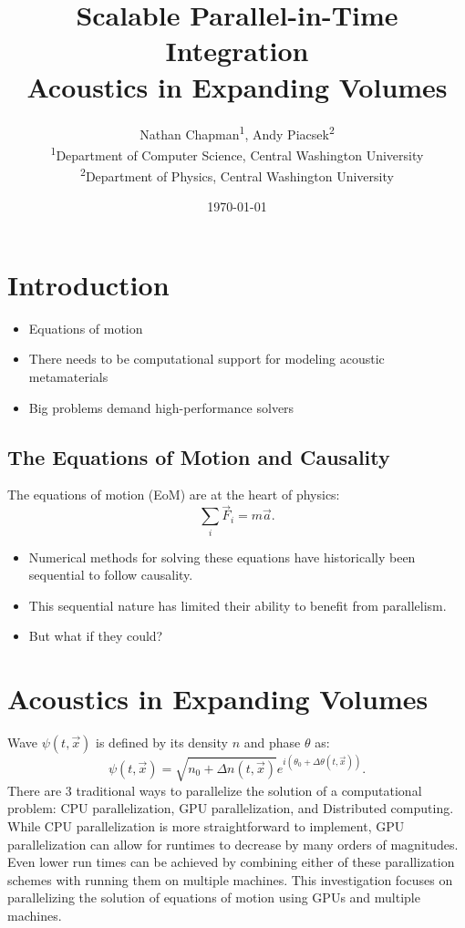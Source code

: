 \title{Scalable Parallel-in-Time Integration \\ \Large{Acoustics in Expanding Volumes}}
\author{
    Nathan Chapman\textsuperscript{1}, Andy Piacsek\textsuperscript{2} \\
    \textsuperscript{1}Department of Computer Science, Central Washington University \\
    \textsuperscript{2}Department of Physics, Central Washington University
}
\date{\today}

\maketitle

\section*{Introduction}
	\begin{itemize}
		\item Equations of motion
		\item There needs to be computational support for modeling acoustic metamaterials
		\item Big problems demand high-performance solvers
	\end{itemize}

\subsection*{The Equations of Motion and Causality}
The equations of motion (EoM) are at the heart of physics:
\[
\sum_i \vec{F}_i = m\vec{a}.
\]

\begin{itemize}
	\item Numerical methods for solving these equations have historically been sequential to follow causality. 
	\item This sequential nature has limited their ability to benefit from parallelism. 
	\item But what if they could?
\end{itemize}

\section*{Acoustics in Expanding Volumes}
Wave $\psi(t, \vec{x})$ is defined by its density $n$ and phase $\theta$ as:
\[
\psi(t, \vec{x}) = \sqrt{n_0 + \Delta n(t, \vec{x})} e^{i(\theta_0 + \Delta \theta(t, \vec{x}))}.
\]
	There are 3 traditional ways to parallelize the solution of a computational problem: 
	CPU parallelization, 
	GPU parallelization, 
	and Distributed computing.  
	While CPU parallelization is more straightforward to implement, GPU parallelization can allow for runtimes to decrease by many orders of magnitudes.
	Even lower run times can be achieved by combining either of these parallization schemes with running them on multiple machines.  This investigation focuses on parallelizing the solution of equations of motion using GPUs and multiple machines.

